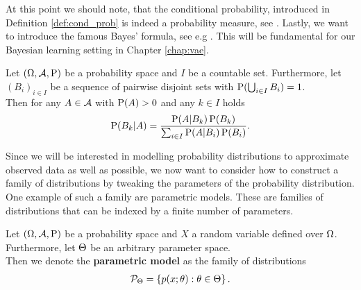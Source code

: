 At this point we should note, that the conditional probability, introduced in Definition \ref{def:cond_prob} is indeed a probability measure, see \cite[Theorem~8.4]{klenke2013probability}. Lastly, we want to introduce the famous Bayes' formula, see e.g \cite[Theorem~8.7]{klenke2013probability}. This will be fundamental for our Bayesian learning setting in Chapter \ref{chap:vae}.

\begin{theorem}\label{theorem:bayes_rule}
Let $(\Omega, \operatorname{\mathcal{A}}, \operatorname{\text{P}})$ be a probability space and $I$ be a countable set. Furthermore, let $(B_i)_{i\in I}$ be a sequence of pairwise disjoint sets with $\operatorname{\text{P}} (\bigcup_{i\in I} B_i) = 1$.\\
Then for any $A\in\operatorname{\mathcal{A}}$ with $\operatorname{\text{P}}(A) > 0$ and any $k\in I$ holds
\begin{align*}
\operatorname{\text{P}}(B_k | A) = \frac{\operatorname{\text{P}}(A | B_k) \operatorname{\text{P}}(B_k)}{\sum_{i \in I} \operatorname{\text{P}}(A | B_i) \operatorname{\text{P}}(B_i)}.
\end{align*}
\end{theorem}

Since we will be interested in modelling probability distributions to approximate observed data as well as possible, we now want to consider how to construct a family of distributions by tweaking the parameters of the probability distribution. One example of such a family are parametric models. These are families of distributions that can be indexed by a finite number of parameters.

\begin{definition}\label{def:parametric_model}
Let $(\Omega, \operatorname{\mathcal{A}}, \operatorname{\text{P}})$ be a probability space and $X$ a random variable defined over $\Omega$. Furthermore, let $\operatorname{\Theta}$ be an arbitrary parameter space.\\
Then we denote the \textbf{parametric model} as the family of distributions
\begin{align*}
\mathcal{P}_{\operatorname{\Theta}} = \left\{ p(x;\theta): \theta\in\operatorname{\Theta} \right\}.
\end{align*}
\end{definition}

